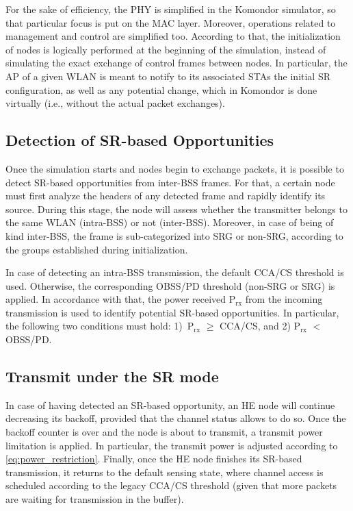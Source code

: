 \documentclass[conference]{IEEEtran}
\begin{document}
	For the sake of efficiency, the PHY is simplified in the Komondor simulator, so that particular focus is put on the MAC layer. Moreover, operations related to management and control are simplified too. According to that, the initialization of nodes is logically performed at the beginning of the simulation, instead of simulating the exact exchange of control frames between nodes. In particular, the AP of a given WLAN is meant to notify to its associated STAs the initial SR configuration, as well as any potential change, which in Komondor is done virtually (i.e., without the actual packet exchanges).
	
	\subsection{Detection of SR-based Opportunities}
	
	Once the simulation starts and nodes begin to exchange packets, it is possible to detect SR-based opportunities from inter-BSS frames. For that, a certain node must first analyze the headers of any detected frame and rapidly identify its source. During this stage, the node will assess whether the transmitter belongs to the same WLAN (intra-BSS) or not (inter-BSS). Moreover, in case of being of kind inter-BSS, the frame is sub-categorized into SRG or non-SRG, according to the groups established during initialization.
	
	In case of detecting an intra-BSS transmission, the default CCA/CS threshold is used. Otherwise, the corresponding OBSS/PD threshold (non-SRG or SRG) is applied. In accordance with that, the power received P$_\text{rx}$ from the incoming transmission is used to identify potential SR-based opportunities. In particular, the following two conditions must hold: 1)~P$_\text{rx}$ $\geq$ CCA/CS, and 2) P$_\text{rx}$ $<$ OBSS/PD.
	
	\subsection{Transmit under the SR mode}
	In case of having detected an SR-based opportunity, an HE node will continue decreasing its backoff, provided that the channel status allows to do so. Once the backoff counter is over and the node is about to transmit, a transmit power limitation is applied. In particular, the transmit power is adjusted according to \eqref{eq:power_restriction}. Finally, once the HE node finishes its SR-based transmission, it returns to the default sensing state, where channel access is scheduled according to the legacy CCA/CS threshold (given that more packets are waiting for transmission in the buffer).
	
\end{document}
